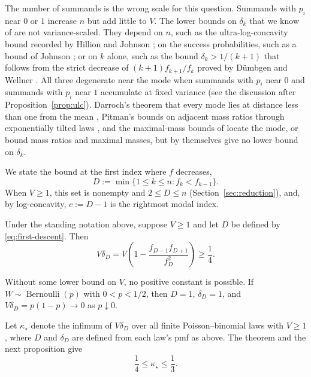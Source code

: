 \documentclass[ECP,preprint]{ejpecp}
\newcommand{\Ber}{\operatorname{Bernoulli}}
\begin{document}
The number of summands is the wrong scale for this question. Summands with
$p_i$ near $0$ or $1$ increase $n$ but add little to $V$. The lower bounds on
$\delta_k$ that we know of are not variance-scaled. They depend on $n$, such
as the ultra-log-concavity bound recorded by Hillion and Johnson
\cite{hillionjohnson2016}; on the success probabilities, such as a bound of
Johnson \cite{johnson2017discrete}; or on $k$ alone, such as the bound
$\delta_k>1/(k+1)$ that follows from the strict decrease of
$(k+1)f_{k+1}/f_k$ proved by D\"umbgen and Wellner
\cite[Proposition~2]{duembgenwellner2020}. All three degenerate near the mode when
summands with $p_i$ near $0$ and summands with $p_i$ near $1$ accumulate at
fixed variance (see the discussion after Proposition~\ref{prop:ulc}).
Darroch's theorem that every mode lies at distance less than one from the
mean \cite{darroch1964}, Pitman's bounds on adjacent mass ratios through
exponentially tilted laws \cite[equations~(20)--(21)]{pitman1997}, and the
maximal-mass bounds of
\cite{bailloncominettivaisman2016,bobkovmarsigliettimelbourne2022} locate the
mode, or bound mass ratios and maximal masses, but by themselves give no lower
bound on $\delta_k$.

We state the bound at the first index where $f$ decreases,
\begin{equation}\label{eq:first-descent}
  D:=\min\{1\leq k\leq n:f_k<f_{k-1}\}.
\end{equation}
When $V\geq1$, this set is nonempty and $2\leq D\leq n$
(Section~\ref{sec:reduction}), and, by log-concavity, $c:=D-1$ is the
rightmost modal index.

\begin{theorem}\label{thm:main}
  Under the standing notation above, suppose $V\geq1$ and let $D$ be defined
  by \eqref{eq:first-descent}. Then
  \begin{equation}\label{eq:main-bound}
    V\delta_D
    =V\left(1-\frac{f_{D-1}f_{D+1}}{f_D^2}\right)
    \geq\frac14.
  \end{equation}
\end{theorem}

Without some lower bound on $V$, no positive constant is possible. If $W\sim\Ber(p)$ with $0<p<1/2$, then $D=1$, $\delta_D=1$, and
$V\delta_D=p(1-p)\to0$ as $p\downarrow0$.

Let $\kappa_\star$ denote the infimum of $V\delta_D$ over all finite
Poisson--binomial laws with $V\geq1$, where $D$ and $\delta_D$ are defined
from each law's pmf as above. The theorem and the next proposition give
\begin{equation}\label{eq:constant-bracket}
  \frac14\leq\kappa_\star\leq\frac13.
\end{equation}
\end{document}
